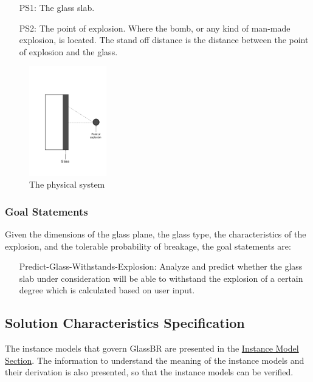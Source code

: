\documentclass[12pt]{article}
\begin{document}
\begin{itemize}
\item[PS1:]{The glass slab.}
\item[PS2:]{The point of explosion. Where the bomb, or any kind of man-made explosion, is located. The stand off distance is the distance between the point of explosion and the glass.}
\end{itemize}
\begin{figure}
\begin{center}
\includegraphics[width=0.3\textwidth]{../../../../datafiles/glassbr/physicalsystimage.png}
\caption{The physical system}
\label{Figure:physSystImage}
\end{center}
\end{figure}
\subsubsection{Goal Statements}
\label{Sec:GoalStmt}
Given the dimensions of the glass plane, the glass type, the characteristics of the explosion, and the tolerable probability of breakage, the goal statements are:

\begin{itemize}
\item[Predict-Glass-Withstands-Explosion:\phantomsection\label{willBreakGS}]{Analyze and predict whether the glass slab under consideration will be able to withstand the explosion of a certain degree which is calculated based on user input.}
\end{itemize}
\subsection{Solution Characteristics Specification}
\label{Sec:SolCharSpec}
The instance models that govern GlassBR are presented in the \hyperref[Sec:IMs]{Instance Model Section}. The information to understand the meaning of the instance models and their derivation is also presented, so that the instance models can be verified.
\end{document}
